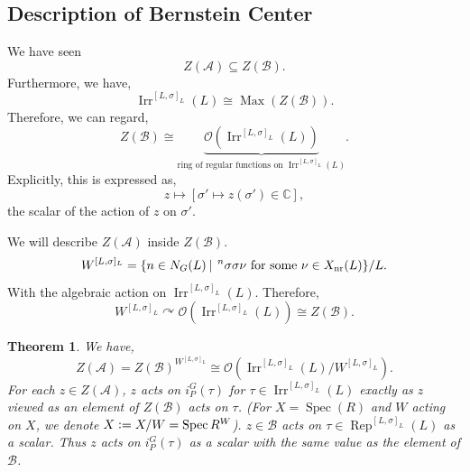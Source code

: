 \documentclass[8pt]{article}
\newtheorem{theorem}{Theorem} [section]
\DeclareMathOperator{\Spec}{Spec}
\DeclareMathOperator{\Rep}{Rep}
\DeclareMathOperator{\Irr}{Irr}
\DeclareMathOperator{\nr}{nr}
\DeclareMathOperator{\Max}{Max}
\newcommand{\defeq}{\vcentcolon=}
\newcommand{\C}[0]{\mathbb{C}}
\newcommand{\sep}[0]{\:|\:}
\newcommand{\cA}{\mathcal{A}}
\newcommand{\cB}{\mathcal{B}}
\newcommand{\Ouv}{\mathcal{O}}
\begin{document}
\subsection{Description of Bernstein Center}
We have seen 
\begin{equation*}
  Z(\cA)\subseteq Z(\cB).
\end{equation*}
Furthermore, we have,
\begin{equation*}
  \Irr^{[L,\sigma]_L}(L)\cong \Max(Z(\cB)).
\end{equation*}
Therefore, we can regard,
\begin{equation*}
  Z(\cB)\cong \underbrace{\Ouv(\Irr^{[L,\sigma]_L}(L))}_{\text{ring of regular functions on $\Irr^{[L,\sigma]_L}(L)$}}.
\end{equation*}
Explicitly, this is expressed as,
\begin{equation*}
  z\mapsto[\sigma'\mapsto z(\sigma')\in\C],
\end{equation*}
the scalar of the action of $z$ on $\sigma'$.
\par We will describe $Z(\cA)$ inside $Z(\cB)$.
\begin{equation*}
  W^{[L,\sigma]_L}=\{n\in N_G(L)\sep
    \prescript{n}{}{\sigma}\sigma\nu\text{ for some $\nu\in X_{\nr}(L)$}\}/L.
\end{equation*}
With the algebraic action on $\Irr^{[L,\sigma]_L}(L)$. Therefore,
\begin{equation*}
  W^{[L,\sigma]_L}\curvearrowright\Ouv(\Irr^{[L,\sigma]_L}(L))\cong Z(\cB).
\end{equation*}
\begin{theorem}
  We have,
  \begin{equation*}
    Z(\cA) = Z(\cB)^{W^{[L,\sigma]_L}}\cong\Ouv(\Irr^{[L,\sigma]_L}(L)/W^{[L,\sigma]_L}).
  \end{equation*}
  For each $z\in Z(\cA)$, $z$ acts on $i_P^G(\tau)$ for $\tau\in\Irr^{[L,\sigma]_L}(L)$ exactly as $z$ viewed as an element of $Z(\cB)$ acts on $\tau$.
  (For $X=\Spec(R)$ and $W$ acting on $X$, we denote $X\defeq X/W = \Spec R^W$).
  \label{theorem_115}
  $z\in \cB$ acts on $\tau\in\Rep^{[L,\sigma]_L}(L)$ as a scalar. Thus $z$ acts on $i_P^G(\tau)$ as a scalar with the same value as the element of $\cB$.
\end{theorem}
  \setcounter{claim}{0}
\end{document}

